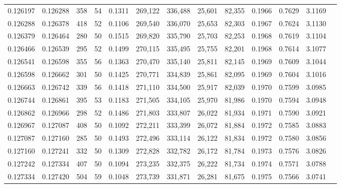 \begin{tabular}{rrrrrrrrrrrrr}
0.126197 & 0.126288 &   358 &  54 &                                     0.1311 & 269,122 & 336,488 &  25,601 &  82,355 & 0.1966 & 0.7629 & 3.1169 \\
0.126288 & 0.126378 &   418 &  52 &                                     0.1106 & 269,540 & 336,070 &  25,653 &  82,303 & 0.1967 & 0.7624 & 3.1130 \\
0.126379 & 0.126464 &   280 &  50 &                                     0.1515 & 269,820 & 335,790 &  25,703 &  82,253 & 0.1968 & 0.7619 & 3.1104 \\
0.126466 & 0.126539 &   295 &  52 &                                     0.1499 & 270,115 & 335,495 &  25,755 &  82,201 & 0.1968 & 0.7614 & 3.1077 \\
0.126541 & 0.126598 &   355 &  56 &                                     0.1363 & 270,470 & 335,140 &  25,811 &  82,145 & 0.1969 & 0.7609 & 3.1044 \\
0.126598 & 0.126662 &   301 &  50 &                                     0.1425 & 270,771 & 334,839 &  25,861 &  82,095 & 0.1969 & 0.7604 & 3.1016 \\
0.126663 & 0.126742 &   339 &  56 &                                     0.1418 & 271,110 & 334,500 &  25,917 &  82,039 & 0.1970 & 0.7599 & 3.0985 \\
0.126744 & 0.126861 &   395 &  53 &                                     0.1183 & 271,505 & 334,105 &  25,970 &  81,986 & 0.1970 & 0.7594 & 3.0948 \\
0.126862 & 0.126966 &   298 &  52 &                                     0.1486 & 271,803 & 333,807 &  26,022 &  81,934 & 0.1971 & 0.7590 & 3.0921 \\
0.126967 & 0.127087 &   408 &  50 &                                     0.1092 & 272,211 & 333,399 &  26,072 &  81,884 & 0.1972 & 0.7585 & 3.0883 \\
0.127087 & 0.127160 &   285 &  50 &                                     0.1493 & 272,496 & 333,114 &  26,122 &  81,834 & 0.1972 & 0.7580 & 3.0856 \\
0.127160 & 0.127241 &   332 &  50 &                                     0.1309 & 272,828 & 332,782 &  26,172 &  81,784 & 0.1973 & 0.7576 & 3.0826 \\
0.127242 & 0.127334 &   407 &  50 &                                     0.1094 & 273,235 & 332,375 &  26,222 &  81,734 & 0.1974 & 0.7571 & 3.0788 \\
0.127334 & 0.127420 &   504 &  59 &                                     0.1048 & 273,739 & 331,871 &  26,281 &  81,675 & 0.1975 & 0.7566 & 3.0741 \\

\end{tabular}
